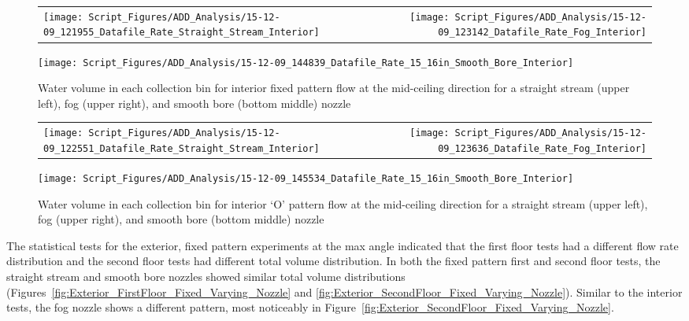 \documentclass{book}
\begin{document}
\begin{figure}[!ht]
\begin{tabular*}{\textwidth}{lr}
\texttt{[image: Script\_Figures/ADD\_Analysis/15-12-09\_121955\_Datafile\_Rate\_Straight\_Stream\_Interior]} &
\texttt{[image: Script\_Figures/ADD\_Analysis/15-12-09\_123142\_Datafile\_Rate\_Fog\_Interior]} \\
\end{tabular*}
\centering
\texttt{[image: Script\_Figures/ADD\_Analysis/15-12-09\_144839\_Datafile\_Rate\_15\_16in\_Smooth\_Bore\_Interior]}
\caption{Water volume in each collection bin for interior fixed pattern flow at the mid-ceiling direction for a straight stream (upper left), fog (upper right), and smooth bore (bottom middle) nozzle}
\label{fig:Interior_Varying_Nozzle_Types_Fixed_Pattern}
\end{figure}

\begin{figure}[ht]
\begin{tabular*}{\textwidth}{lr}
\texttt{[image: Script\_Figures/ADD\_Analysis/15-12-09\_122551\_Datafile\_Rate\_Straight\_Stream\_Interior]} &
\texttt{[image: Script\_Figures/ADD\_Analysis/15-12-09\_123636\_Datafile\_Rate\_Fog\_Interior]} \\
\end{tabular*}
\centering
\texttt{[image: Script\_Figures/ADD\_Analysis/15-12-09\_145534\_Datafile\_Rate\_15\_16in\_Smooth\_Bore\_Interior]}
\caption{Water volume in each collection bin for interior `O' pattern flow at the mid-ceiling direction for a straight stream (upper left), fog (upper right), and smooth bore (bottom middle) nozzle}
\label{fig:Interior_Varying_Nozzle_Types_O_Pattern}
\end{figure}

\clearpage

The statistical tests for the exterior, fixed pattern experiments at the max angle indicated that the first floor tests had a different flow rate distribution and the second floor tests had different total volume distribution. In both the fixed pattern first and second floor tests, the straight stream and smooth bore nozzles showed similar total volume distributions (Figures~\ref{fig:Exterior_FirstFloor_Fixed_Varying_Nozzle} and \ref{fig:Exterior_SecondFloor_Fixed_Varying_Nozzle}). Similar to the interior tests, the fog nozzle shows a different pattern, most noticeably in Figure~\ref{fig:Exterior_SecondFloor_Fixed_Varying_Nozzle}. 
\end{document}
